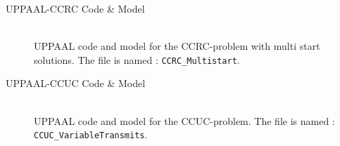 \begin{description}
\item[UPPAAL-CCRC Code \& Model\label{UPPAAL-CCRC-Code}]\hfill\\
    UPPAAL code and model for the CCRC-problem with multi start solutions. The file is named : \texttt{CCRC\_Multistart}.
    
\item[UPPAAL-CCUC Code \& Model\label{UPPAAL-CCUC-Code}]\hfill\\
    UPPAAL code and model for the CCUC-problem.
    The file is named : \texttt{CCUC\_VariableTransmits}.
\end{description}